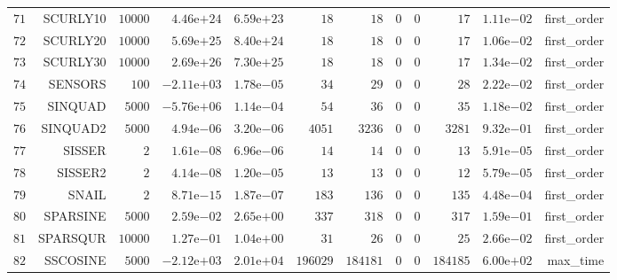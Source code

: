 \begin{longtable}{rrrrrrrrrrrr}
  \(    71\) & SCURLY10 & \( 10000\) & \( 4.46\)e\(+24\) & \( 6.59\)e\(+23\) & \(    18\) & \(    18\) & \(     0\) & \(     0\) & \(    17\) & \( 1.11\)e\(-02\) & first\_order \\
  \(    72\) & SCURLY20 & \( 10000\) & \( 5.69\)e\(+25\) & \( 8.40\)e\(+24\) & \(    18\) & \(    18\) & \(     0\) & \(     0\) & \(    17\) & \( 1.06\)e\(-02\) & first\_order \\
  \(    73\) & SCURLY30 & \( 10000\) & \( 2.69\)e\(+26\) & \( 7.30\)e\(+25\) & \(    18\) & \(    18\) & \(     0\) & \(     0\) & \(    17\) & \( 1.34\)e\(-02\) & first\_order \\
  \(    74\) & SENSORS & \(   100\) & \(-2.11\)e\(+03\) & \( 1.78\)e\(-05\) & \(    34\) & \(    29\) & \(     0\) & \(     0\) & \(    28\) & \( 2.22\)e\(-02\) & first\_order \\
  \(    75\) & SINQUAD & \(  5000\) & \(-5.76\)e\(+06\) & \( 1.14\)e\(-04\) & \(    54\) & \(    36\) & \(     0\) & \(     0\) & \(    35\) & \( 1.18\)e\(-02\) & first\_order \\
  \(    76\) & SINQUAD2 & \(  5000\) & \( 4.94\)e\(-06\) & \( 3.20\)e\(-06\) & \(  4051\) & \(  3236\) & \(     0\) & \(     0\) & \(  3281\) & \( 9.32\)e\(-01\) & first\_order \\
  \(    77\) & SISSER & \(     2\) & \( 1.61\)e\(-08\) & \( 6.96\)e\(-06\) & \(    14\) & \(    14\) & \(     0\) & \(     0\) & \(    13\) & \( 5.91\)e\(-05\) & first\_order \\
  \(    78\) & SISSER2 & \(     2\) & \( 4.14\)e\(-08\) & \( 1.20\)e\(-05\) & \(    13\) & \(    13\) & \(     0\) & \(     0\) & \(    12\) & \( 5.79\)e\(-05\) & first\_order \\
  \(    79\) & SNAIL & \(     2\) & \( 8.71\)e\(-15\) & \( 1.87\)e\(-07\) & \(   183\) & \(   136\) & \(     0\) & \(     0\) & \(   135\) & \( 4.48\)e\(-04\) & first\_order \\
  \(    80\) & SPARSINE & \(  5000\) & \( 2.59\)e\(-02\) & \( 2.65\)e\(+00\) & \(   337\) & \(   318\) & \(     0\) & \(     0\) & \(   317\) & \( 1.59\)e\(-01\) & first\_order \\
  \(    81\) & SPARSQUR & \( 10000\) & \( 1.27\)e\(-01\) & \( 1.04\)e\(+00\) & \(    31\) & \(    26\) & \(     0\) & \(     0\) & \(    25\) & \( 2.66\)e\(-02\) & first\_order \\
  \(    82\) & SSCOSINE & \(  5000\) & \(-2.12\)e\(+03\) & \( 2.01\)e\(+04\) & \(196029\) & \(184181\) & \(     0\) & \(     0\) & \(184185\) & \( 6.00\)e\(+02\) & max\_time \\

\end{longtable}
